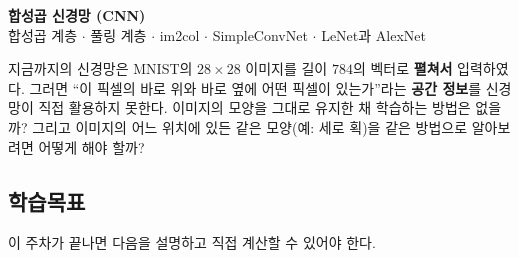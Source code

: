 \documentclass[11pt,a4paper]{article}
\begin{document}

\def\cellsz{0.5}%
\newcommand{\numgrid}[4]{%
  \foreach \v [count=\k from 0] in {#4} {%
    \pgfmathtruncatemacro{\rr}{int(\k/#3)}%
    \pgfmathtruncatemacro{\cc}{mod(\k,#3)}%
    \draw[black!55] ({#1+\cc*\cellsz},{#2-\rr*\cellsz}) rectangle ++(\cellsz,-\cellsz);%
    \node[font=\small] at ({#1+\cc*\cellsz+0.5*\cellsz},{#2-\rr*\cellsz-0.5*\cellsz}) {\v};%
  }}
\newcommand{\cuboid}[6]{%
  \filldraw[fill=#6!25,draw=black!70] ({#1},{#2}) rectangle ++({#3},{#4});%
  \filldraw[fill=#6!40,draw=black!70] ({#1},{#2+#4}) -- ++({0.5*#5},{0.4*#5}) -- ++({#3},0) -- ++({-0.5*#5},{-0.4*#5}) -- cycle;%
  \filldraw[fill=#6!55,draw=black!70] ({#1+#3},{#2}) -- ++({0.5*#5},{0.4*#5}) -- ++(0,{#4}) -- ++({-0.5*#5},{-0.4*#5}) -- cycle;%
}

\begin{center}
{\LARGE\bfseries 합성곱 신경망 (CNN)}\\[0.35em]
{\large 합성곱 계층 $\cdot$ 풀링 계층 $\cdot$ im2col $\cdot$ SimpleConvNet $\cdot$ LeNet과 AlexNet}\\[0.8em]
\end{center}

\vspace{0.4em}

\begin{keybox}[이번 주의 핵심 질문]
지금까지의 신경망은 MNIST의 $28\times28$ 이미지를 길이 $784$의 벡터로 \textbf{펼쳐서} 입력하였다.
그러면 ``이 픽셀의 바로 위와 바로 옆에 어떤 픽셀이 있는가''라는 \textbf{공간 정보}를 신경망이 직접 활용하지 못한다.
이미지의 모양을 그대로 유지한 채 학습하는 방법은 없을까?
그리고 이미지의 어느 위치에 있든 같은 모양(예: 세로 획)을 같은 방법으로 알아보려면 어떻게 해야 할까?
\end{keybox}

\subsection*{학습목표}

이 주차가 끝나면 다음을 설명하고 직접 계산할 수 있어야 한다.
\end{document}
